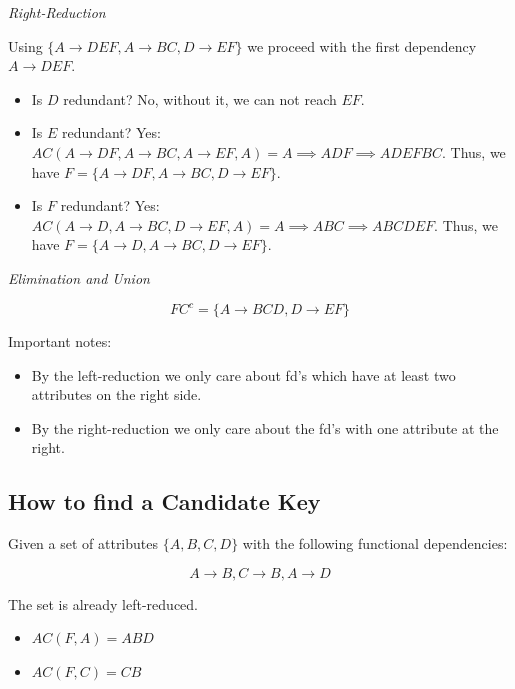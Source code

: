 \emph{Right-Reduction}

Using \(\{A \to DEF, A \to BC, D \to EF\}\) we proceed with the first dependency 
\(A \to DEF\).

\begin{itemize}
    
    \item Is \(D\) redundant? No, without it, we can not reach \(EF\).
    
    \item Is \(E\) redundant? Yes: \(AC(A \to DF, A \to BC, A \to EF, A) = A \implies ADF \implies ADEFBC\).  
    Thus, we have \(F = \{A \to DF, A \to BC, D \to EF\}\).
    
    \item Is \(F\) redundant? Yes: \(AC(A \to D, A \to BC, D \to EF, A) = A \implies ABC \implies ABCDEF\).  
    Thus, we have \(F = \{A \to D, A \to BC, D \to EF\}\).

\end{itemize}

\emph{Elimination and Union}

\[
    FC^c = \{A \to BCD, D \to EF\}
\]

Important notes:

\begin{itemize}
    
    \item By the left-reduction we only care about fd's which have at least two attributes on the right side.
    
    \item By the right-reduction we only care about the fd's with one attribute at the right.

\end{itemize}

\subsection{How to find a Candidate Key}

Given a set of attributes \(\{A,B,C,D\}\) with the following functional dependencies:

\[
    A \to B, C \to B, A \to D
\]

The set is already left-reduced. 

\begin{itemize} 
   
    \item \(AC(F, A) = ABD\)
    
    \item \(AC(F, C) = CB\)

\end{itemize}

